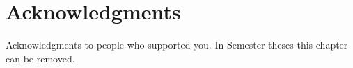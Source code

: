 \chapter{Acknowledgments}

Acknowledgments to people who supported you. In Semester theses this chapter can be removed.

